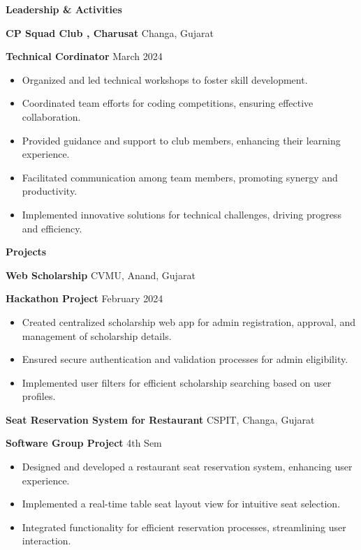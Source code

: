 \documentclass[11pt]{article}
\begin{document}
\begin{center}
    \textbf{Leadership \& Activities}
\end{center}

\textbf{CP Squad Club , Charusat}	\hfill Changa, Gujarat

\textbf{Technical Cordinator} \hfill March 2024
\begin{itemize}[noitemsep, topsep=0pt, partopsep=0pt, parsep=0pt]
   \item Organized and led technical workshops to foster skill development.
    \item Coordinated team efforts for coding competitions, ensuring effective collaboration.
    \item Provided guidance and support to club members, enhancing their learning experience.
    \item Facilitated communication among team members, promoting synergy and productivity.
    \item Implemented innovative solutions for technical challenges, driving progress and efficiency.

\end{itemize}


\vspace{12pt}



\begin{center}
    \textbf{Projects }
\end{center}

\textbf{Web Scholarship}	\hfill CVMU, Anand, Gujarat

\textbf{Hackathon Project} \hfill February 2024
\begin{itemize}[noitemsep, topsep=0pt, partopsep=0pt, parsep=0pt]
    \item Created centralized scholarship web app for admin registration, approval, and management of scholarship details.
    \item Ensured secure authentication and validation processes for admin eligibility.
    \item Implemented user filters for efficient scholarship searching based on user profiles.
\end{itemize}

\vspace{12pt}

\textbf{Seat Reservation System for Restaurant}	\hfill CSPIT, Changa, Gujarat

\textbf{Software Group Project} \hfill 4th Sem
\begin{itemize}[noitemsep, topsep=0pt, partopsep=0pt, parsep=0pt]
    \item Designed and developed a restaurant seat reservation system, enhancing user experience.
    \item Implemented a real-time table seat layout view for intuitive seat selection.
    \item Integrated functionality for efficient reservation processes, streamlining user interaction.

\end{itemize}
\end{document}
